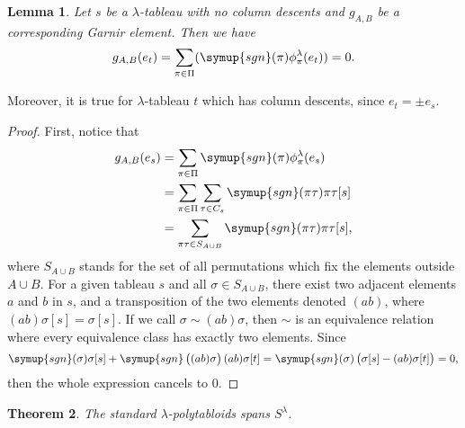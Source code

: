 \documentclass{assignment}[2019/10/15]
\theoremstyle{plain}
\newtheorem{theorem}{Theorem}[section]
\newtheorem{lemma}[theorem]{Lemma}
\newcommand{\sgn}{\mathop{}\!\symup{sgn}}
\begin{document}
    \begin{lemma}\label{lem: Garnir}
        Let $s$ be a $\lambda$-tableau with no column descents and $g_{A, B}$ be a corresponding Garnir element. Then we have
        \begin{equation}
            g_{A, B}(e_t) = \sum_{\pi\in\Pi}(\sgn(\pi)\phi_\pi^\lambda(e_t))=0.
        \end{equation}
    \end{lemma}

    Moreover, it is true for $\lambda$-tableau $t$ which has column descents, since $e_t=\pm e_s$.

    \begin{proof}
        First, notice that
        \begin{equation}
            \begin{aligned}
                g_{A, B}(e_s)
                &= \sum_{\pi\in\Pi}\sgn(\pi)\phi_\pi^\lambda(e_s)\\
                &= \sum_{\pi\in\Pi}\sum_{\tau\in C_s}\sgn(\pi\tau)\pi\tau[s]\\
                &= \sum_{\pi\tau\in S_{A\cup B}}\sgn(\pi\tau)\pi\tau[s],
            \end{aligned}
        \end{equation}
        where $S_{A\cup B}$ stands for the set of all permutations which fix the elements outside $A\cup B$. For a given tableau $s$ and all $\sigma\in S_{A\cup B}$, there exist two adjacent elements $a$ and $b$ in $s$, and a transposition of the two elements denoted $(a b)$, where $(a b)\sigma[s] = \sigma[s]$. If we call $\sigma\sim (a b)\sigma$, then $\sim$ is an equivalence relation where every equivalence class has exactly two elements. Since
        \begin{equation}
            \sgn(\sigma)\sigma[s] + \sgn\left((a b)\sigma\right)(a b)\sigma[t] = \sgn(\sigma)\left(\sigma[s]-(a b)\sigma[t]\right) = 0,
        \end{equation}
        then the whole expression cancels to 0.
    \end{proof}

    \begin{theorem}
        The standard $\lambda$-polytabloids spans $S^\lambda$.
    \end{theorem}
\end{document}
